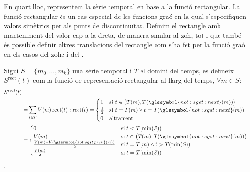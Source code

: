 En quart lloc, representem la sèrie temporal en base a la funció
rectangular. La funció rectangular és un cas especial de les funcions
graó en la qual s'especifiquen valors simètrics per als punts de
discontinuïtat. Definim el rectangle amb manteniment del valor cap a
la dreta, de manera similar al \gls{zoh}, tot i que també és possible
definir altres translacions del rectangle com s'ha fet per la funció
graó en els casos del \gls{zohe} i del .
\begin{definition}
  Sigui $S=\{m_0,\ldots,m_k\}$ una sèrie temporal i $T$ el domini del
  temps, es defineix $S^\text{rect}(t)$ com la funció de representació
  rectangular al llarg del temps, $\forall m \in S:$
  \begin{align*}
    S^\text{rect}(t) = &  \\
    = & \sum_{t\in T} V(m) \operatorname{rect}(t):  \operatorname{rect}(t) = 
    \begin{cases}
      1 & \text{si } t\in \big(T(m),T(\glssymbol{not:sgst:next}(m))\big) \\
      \frac{1}{2}& \text{si } t = T(m) \vee t=T(\glssymbol{not:sgst:next}(m)) \\
      0 & \text{altrament}
    \end{cases} \\
    = & \begin{cases}
      0 & \text{si }  t<T(\min(S)) \\
      V(m) & \text{si } t\in \big(T(m),T(\glssymbol{not:sgst:next}(m))\big) \\
      \frac{V(m)+V(\glssymbol{not:sgst:prev}(m))}{2} & \text{si } t = T(m) \wedge t > T(\min(S)) \\
      \frac{V(m)}{2} & \text{si } t = T(\min(S)) \\
    \end{cases}
         \end{align*}.
\end{definition}




